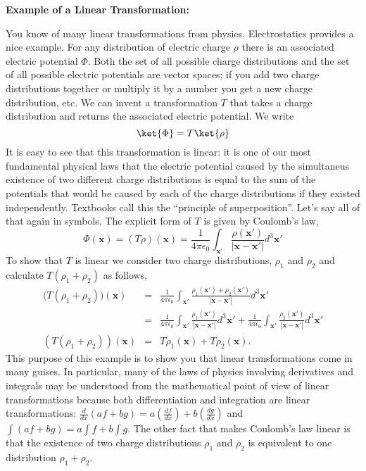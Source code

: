 \begin{flushleft}\textbf{Example of a Linear Transformation:}\end{flushleft}
You know of many linear transformations from physics.  Electrostatics provides a nice example.  For any distribution of electric charge $\rho$ there is an associated electric potential $\Phi$.  Both the set of all possible charge distributions and the set of all possible electric potentials are vector spaces; if you add two charge distributions together or multiply it by a number you get a new charge distribution, etc.  We can invent a transformation $T$ that takes a charge distribution and returns the associated electric potential.  We write
\begin{displaymath}
\ket{\Phi} = T\ket{\rho}
\end{displaymath}
It is easy to see that this transformation is linear: it is one of our most fundamental physical laws that the electric potential caused by the simultaneus existence of two different charge distributions is equal to the sum of the potentials that would be caused by each of the charge distributions if they existed independently.  Textbooks call this the ``principle of superposition''.  Let's say all of that again in symbols.  The explicit form of $T$ is given by Coulomb's law,
\begin{displaymath} \Phi (\textbf{x}) = (T\rho )(\textbf{x}) = \frac{1}{4 \pi \epsilon _0} \int_{\textbf{x}'} \frac{\rho (\textbf{x}')}{|\textbf{x} - \textbf{x}'|} d^{3}\textbf{x}'\end{displaymath}
To show that $T$ is linear we consider two charge distributions, $\rho_1$ and $\rho_2$ and calculate $T(\rho _1 + \rho_2)$ as follows,
\begin{eqnarray*}
\bigl( T(\rho _1 + \rho _2)\bigr) (\textbf{x}) &=& \frac{1}{4 \pi \epsilon _0} \int_{\textbf{x}'} \frac{\rho _1 (\textbf{x}') + \rho _2 (\textbf{x}')}{|\textbf{x} - \textbf{x}'|} d^{3}\textbf{x}'\\
&=& \frac{1}{4 \pi \epsilon _0} \int_{\textbf{x}'} \frac{\rho _1 (\textbf{x}')}{|\textbf{x} - \textbf{x}'|} d^{3}\textbf{x}' + \frac{1}{4 \pi \epsilon _0} \int_{\textbf{x}'} \frac{\rho _2 (\textbf{x}')}{|\textbf{x} - \textbf{x}'|} d^{3}\textbf{x}'\\
(T(\rho_1 + \rho_2))(\textbf{x}) &=& T\rho _1 (\textbf{x}) + T\rho _2 (\textbf{x}).
\end{eqnarray*}
This purpose of this example is to show you that linear transformations come in many guises.  In particular, many of the laws of physics involving derivatives and integrals may be understood from the mathematical point of view of linear transformations because both differentiation and integration are linear transformations: $\frac{d}{dx}(af + bg) = a(\frac{df}{dx}) + b(\frac{dg}{dx})$ and $\int(af + bg) = a\int{f} + b\int{g}$. The other fact that makes Coulomb's law linear is that the existence of two charge distributions $\rho_1$ and $\rho_2$ is equivalent to one distribution $\rho_1 + \rho_2$.

